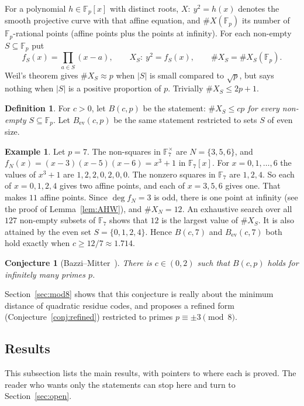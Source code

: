 \documentclass[12pt,letterpaper]{article}
\newtheorem{conjecture}[theorem]{Conjecture}
\theoremstyle{definition}
\newtheorem{definition}[theorem]{Definition}
\newtheorem{example}[theorem]{Example}
\theoremstyle{remark}
\numberwithin{equation}{section}
\newcommand{\F}{\mathbb{F}}
\newcommand{\Fp}{\mathbb{F}_p}
\newcommand{\X}{\#X}
\begin{document}
For a polynomial $h\in\Fp[x]$ with distinct roots, $X:\ y^2=h(x)$ denotes the
smooth projective curve with that affine equation, and $\X(\Fp)$ its number of
$\Fp$-rational points (affine points plus the points at infinity).
For each non-empty $S\subseteq\Fp$ put
\[
f_S(x)=\prod_{a\in S}(x-a),\qquad X_S:\ y^2=f_S(x),\qquad \X_S=\X_S(\Fp).
\]
Weil's theorem gives $\X_S\approx p$ when $|S|$ is small compared to $\sqrt p$,
but says nothing when $|S|$ is a positive proportion of $p$. Trivially
$\X_S\le 2p+1$.

\begin{definition}\label{def:B}
For $c>0$, let $B(c,p)$ be the statement: \emph{$\X_S\le cp$ for every non-empty
$S\subseteq\Fp$}. Let $B_{\mathrm{ev}}(c,p)$ be the same statement restricted to
sets $S$ of even size.
\end{definition}

\begin{example}\label{ex:Bp7}
Let $p=7$. The non-squares in $\F_7^\times$ are $N=\{3,5,6\}$, and
$f_N(x)=(x-3)(x-5)(x-6)=x^3+1$ in $\F_7[x]$. For $x=0,1,\dots,6$ the values of
$x^3+1$ are $1,2,2,0,2,0,0$. The nonzero squares in $\F_7$ are $1,2,4$. So each of
$x=0,1,2,4$ gives two affine points, and each of $x=3,5,6$ gives one. That makes
$11$ affine points. Since $\deg f_N=3$ is odd, there is one point at infinity (see
the proof of Lemma~\ref{lem:AHW}), and $\X_N=12$. An exhaustive search over all
$127$ non-empty subsets of $\F_7$ shows that $12$ is the largest value of $\X_S$.
It is also attained by the even set $S=\{0,1,2,4\}$. Hence $B(c,7)$ and
$B_{\mathrm{ev}}(c,7)$ both hold exactly when $c\ge 12/7\approx1.714$.
\end{example}

\begin{conjecture}[Bazzi--Mitter~\cite{BM06}]\label{conj:BM}
There is $c\in(0,2)$ such that $B(c,p)$ holds for infinitely many primes $p$.
\end{conjecture}

Section~\ref{sec:mod8} shows that this conjecture is really about the minimum
distance of quadratic residue codes, and proposes a refined form
(Conjecture~\ref{conj:refined}) restricted to primes $p\equiv\pm3\pmod8$.

\subsection{Results}
This subsection lists the main results, with pointers to where each is proved. The
reader who wants only the statements can stop here and turn to
Section~\ref{sec:open}.
\end{document}
